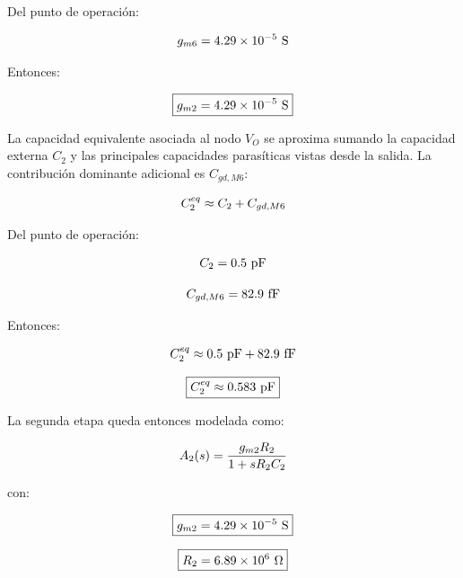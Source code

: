 Del punto de operación:

\begin{equation}\notag
g_{m6}=4.29\times 10^{-5}\ \mathrm{S}
\end{equation}

Entonces:

\begin{equation}\notag
\boxed{
g_{m2}=4.29\times 10^{-5}\ \mathrm{S}
}
\end{equation}

La capacidad equivalente asociada al nodo \(V_O\) se aproxima sumando la capacidad externa \(C_2\) y las principales capacidades parasíticas vistas desde la salida. La contribución dominante adicional es \(C_{gd,M6}\):

\begin{equation}\notag
C_2^{eq}
\approx
C_2
+
C_{gd,M6}
\end{equation}

Del punto de operación:

\begin{equation}\notag
C_2=0.5\ \mathrm{pF}
\end{equation}

\begin{equation}\notag
C_{gd,M6}=82.9\ \mathrm{fF}
\end{equation}

Entonces:

\begin{equation}\notag
C_2^{eq}
\approx
0.5\ \mathrm{pF}
+
82.9\ \mathrm{fF}
\end{equation}

\begin{equation}\notag
\boxed{
C_2^{eq}\approx 0.583\ \mathrm{pF}
}
\end{equation}

La segunda etapa queda entonces modelada como:

\begin{equation}\notag
A_2(s)=
\frac{g_{m2}R_2}{1+sR_2C_2}
\end{equation}

con:

\begin{equation}\notag
\boxed{
g_{m2}=4.29\times 10^{-5}\ \mathrm{S}
}
\end{equation}

\begin{equation}\notag
\boxed{
R_2=6.89\times 10^{6}\ \Omega
}
\end{equation}

